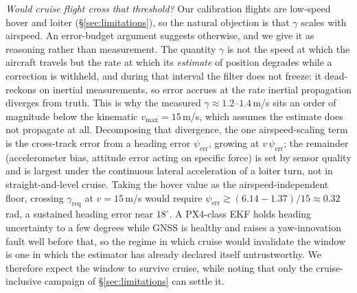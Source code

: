 \emph{Would cruise flight cross that threshold?} Our calibration flights are
low-speed hover and loiter (\S\ref{sec:limitations}), so the natural objection is
that $\gamma$ scales with airspeed. An error-budget argument suggests otherwise,
and we give it as reasoning rather than measurement. The quantity $\gamma$ is not
the speed at which the aircraft travels but the rate at which its \emph{estimate}
of position degrades while a correction is withheld, and during that interval
the filter does not freeze: it dead-reckons on inertial measurements, so error
accrues at the rate inertial propagation diverges from truth. This is why the
measured $\gamma\approx1.2$--$1.4$\,m/s sits an order of magnitude below the
kinematic $v_{\max}=15$\,m/s, which assumes the estimate does not propagate at
all. Decomposing that divergence, the one airspeed-scaling term is the
cross-track error from a heading error $\psi_{\mathrm{err}}$, growing at
$v\,\psi_{\mathrm{err}}$; the remainder (accelerometer bias, attitude error acting
on specific force) is set by sensor quality and is largest under the continuous
lateral acceleration of a loiter turn, not in straight-and-level cruise. Taking
the hover value as the airspeed-independent floor, crossing
$\gamma_{\mathrm{req}}$ at $v=15$\,m/s would require
$\psi_{\mathrm{err}}\gtrsim(6.14-1.37)/15\approx0.32$\,rad, a sustained heading
error near $18^\circ$. A PX4-class EKF holds heading uncertainty to a few degrees
while GNSS is healthy and raises a yaw-innovation fault well before that, so the
regime in which cruise would invalidate the window is one in which the estimator
has already declared itself untrustworthy. We therefore expect the window to
survive cruise, while noting that only the cruise-inclusive campaign of
\S\ref{sec:limitations} can settle it.

